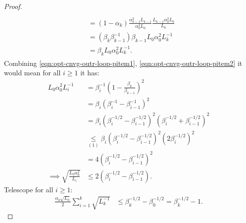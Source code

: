 \documentclass[12pt]{article}
\begin{document}
\begin{proof}
\begin{align}
\begin{split}
                \\
                &= 
                (1 - \alpha_k)
                \frac{\alpha_{k - 1}^2L_{k - 1}}{\alpha_0^2L_0}
                \frac{L_{k - 1}\alpha_0^2L_0}{L_k}
                \\
                &= 
                (\beta_k\beta_{k - 1}^{-1})\beta_{k - 1}L_0\alpha_0^2L_k^{-1}
                \\
                &= \beta_kL_0\alpha_0^2L_k^{-1}.         
            \end{split}\end{align}
            Combining \eqref{eqn:opt-cnvg-outr-loop-pitem1}, \eqref{eqn:opt-cnvg-outr-loop-pitem2} it would mean for all $i \ge 1$ it has: 
            \begin{align*}
                L_0 \alpha_0^2 L_i^{-1} &= 
                \beta_i^{-1}\left(
                    1 - \frac{\beta_k}{\beta_{k - 1}}
                \right)^2
                \\
                &= 
                \beta_i \left(
                    \beta_i^{-1} - \beta_{i - 1}^{-1}
                \right)^2
                \\
                &=
                \beta_i \left(
                    \beta_i^{-1/2} - \beta_{i - 1}^{-1/2}
                \right)^2
                \left(
                    \beta_i^{-1/2} + \beta_{i - 1}^{-1/2}
                \right)^2
                \\
                &\underset{(1)}{\le} 
                \beta_i \left(
                    \beta_i^{-1/2} - \beta_{i - 1}^{-1/2}
                \right)^2
                \left(
                    2\beta_i^{-1/2}
                \right)^2
                \\
                &= 4\left(
                    \beta_i^{-1/2} - \beta_{i - 1}^{-1/2}
                \right)^2
                \\
                \implies
                \sqrt{\frac{L_0\alpha_0^2}{L_i}} &\le
                2 \left(
                    \beta_i^{-1/2} - \beta_{i - 1}^{-1/2}
                \right).
            \end{align*}
            Telescope for all $i \ge 1$: 
            \begin{align*}
                \frac{\alpha_0\sqrt{L_0}}{2}\sum_{i = 1}^{k}\sqrt{L^{-1}_k}
                &\le 
                \beta_k^{-1/2} - \beta_{0}^{-1/2} = 
                \beta_k^{-1/2} - 1. 
            \end{align*}

\end{proof}
\end{document}
